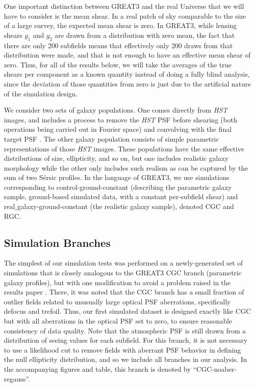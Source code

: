 \documentclass[iop]{emulateapj}
\begin{document}
One important distinction between GREAT3 and the real Universe that we
will have to consider is the mean shear.  In a real patch of sky
comparable to the size of a large survey, the expected mean shear is
zero.  In GREAT3, while lensing shears $g_1$ and $g_2$ are drawn from
a distribution with zero mean, the fact that there are only 200
subfields means that effectively only 200 draws from that distribution
were made, and that is not enough to have an effective mean shear of
zero.  Thus, for all of the results below, we will take the averages
of the true shears per component as a known quantity instead of doing
a fully blind analysis, since the deviation of those quantities from
zero is just due to the artificial nature of the simulation design.

We consider two sets of galaxy populations.  One comes directly from
{\it HST} images, and includes a process to remove the {\it HST} PSF before
shearing (both operations being carried out in Fourier space) and
convolving with the final target PSF \citep{2012MNRAS.420.1518M}.  The
other galaxy population consists of simple parametric representations
of those {\it HST} images.  These populations have the same effective
distributions of size, ellipticity, and so on, but one includes
realistic galaxy morphology while the other only includes such realism
as can be captured by the sum of two S\'{e}rsic profiles.  In the
language of GREAT3, we use simulations corresponding to
control-ground-constant (describing the parametric galaxy sample,
ground-based simulated data, with a constant per-subfield shear) and
real$\_$galaxy-ground-constant (the realistic galaxy sample), denoted
CGC and RGC.

\subsection{Simulation Branches}
\label{sec:branches}

The simplest of our simulation tests was performed on a
newly-generated set of simulations that is closely analogous to the
GREAT3 CGC branch (parametric galaxy profiles), but with one
modification to avoid a problem raised in the results paper
\citep{2015MNRAS.450.2963M}.  There, it was noted that the CGC branch
has a small fraction of outlier fields related to unusually large optical PSF
aberrations, specifically defocus and trefoil.  Thus, our first
simulated dataset is designed exactly like CGC but with all
aberrations in the optical PSF set to zero, to ensure reasonable
consistency of data quality.  Note that the atmospheric PSF is still
drawn from a distribution of seeing values for each subfield. For this
branch, it is not necessary to use a likelihood cut to remove fields
with aberrant PSF behavior in defining the null ellipticity
distribution, and so we include all branches in our analysis. In the
accompanying figures and table, this branch is denoted by
``CGC-noaber-regauss''.
\end{document}

